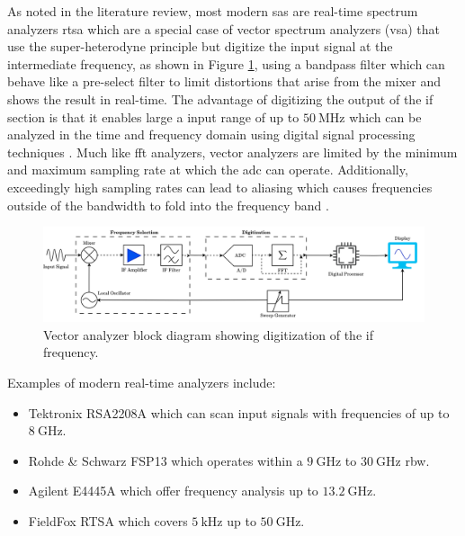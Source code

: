\documentclass[class=report,11pt,crop=false]{standalone}
\begin{document}
	As noted in the literature review, most modern \acrshort{sa}s are real-time spectrum analyzers \acrshort{rtsa} which are a special case of vector spectrum analyzers (\acrshort{vsa}) that use the super-heterodyne principle but digitize the input signal at the intermediate frequency, as shown in Figure \ref{fig:vector-analyzer-rover}, using a bandpass filter which can behave like a pre-select filter to limit distortions that arise from the mixer and shows the result in real-time. The advantage of digitizing the output of the \acrshort{if} section is that it enables large a input range of up to $\SI{50}{\mega\hertz}$ which can be analyzed in the time and frequency domain using digital signal processing techniques \cite{rovers2006}. Much like \acrshort{fft} analyzers, vector analyzers are limited by the minimum and maximum sampling rate at which the \acrshort{adc} can operate. Additionally, exceedingly high sampling rates can lead to aliasing which causes frequencies outside of the bandwidth to fold into the frequency band \cite{rovers2006}. 	

	\begin{figure}[!ht]
		\centering
		\label{fig:vector-analyzer-rover}
		\includegraphics[width=1.0\linewidth]{Figures/Methodology/real-time-analyzer-rover.png}
		\caption{Vector analyzer block diagram showing digitization of the \acrshort{if} frequency.}
	\end{figure}

	Examples of modern real-time analyzers include:
	
	\begin{itemize}
		\item 
		Tektronix RSA2208A which can scan input signals with frequencies of up to $\SI{8}{\giga\hertz}$.
		\item 
		Rohde \& Schwarz FSP13 which operates within a $\SI{9}{\giga\hertz}$ to $\SI{30}{\giga\hertz}$ \acrshort{rbw}.
		\item
		Agilent E4445A which offer frequency analysis up to $\SI{13.2}{\giga\hertz}$.
		\item 
		FieldFox RTSA which covers $\SI{5}{\kilo\hertz}$ up to $\SI{50}{\giga\hertz}$.
	\end{itemize}
\end{document}

